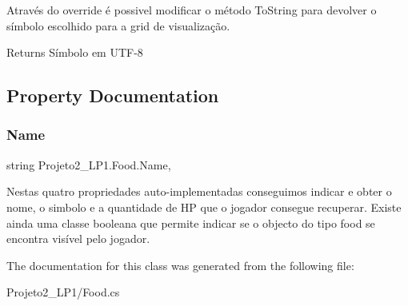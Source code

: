 Através do override é possivel modificar o método To\+String para devolver o símbolo escolhido para a grid de visualização. 

\begin{DoxyReturn}{Returns}
Símbolo em U\+T\+F-\/8
\end{DoxyReturn}


\subsection{Property Documentation}
\mbox{\label{class_projeto2___l_p1_1_1_food_aa86fad941d17cf9d1972fc6da07c8359}} 
\subsubsection{\texorpdfstring{Name}{Name}}
{\footnotesize\ttfamily string Projeto2\+\_\+\+L\+P1.\+Food.\+Name\hspace{0.3cm}{\ttfamily [get]}, {\ttfamily [set]}}



Nestas quatro propriedades auto-\/implementadas conseguimos indicar e obter o nome, o simbolo e a quantidade de HP que o jogador consegue recuperar. Existe ainda uma classe booleana que permite indicar se o objecto do tipo food se encontra visível pelo jogador. 



The documentation for this class was generated from the following file\+:\begin{DoxyCompactItemize}
\item 
Projeto2\+\_\+\+L\+P1/Food.\+cs\end{DoxyCompactItemize}
